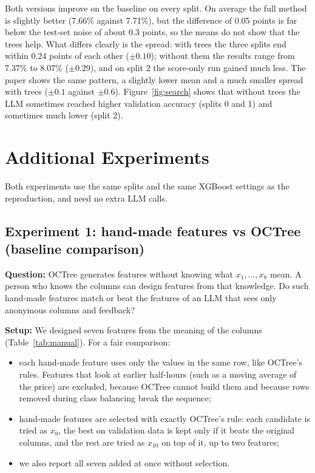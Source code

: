 \documentclass[11pt]{article}
\begin{document}
Both versions improve on the baseline on every split. On average the full method is slightly
better (7.66\% against 7.71\%), but the difference of 0.05 points is far below the test-set noise of
about 0.3 points, so the means do not show that the trees help. What differs clearly is the spread:
with trees the three splits end within 0.24 points of each other ($\pm0.10$); without them the
results range from 7.37\% to 8.07\% ($\pm0.29$), and on split 2 the score-only run gained much less.
The paper shows the same pattern, a slightly lower mean and a much smaller spread with trees ($\pm0.1$
against $\pm0.6$). Figure~\ref{fig:search} shows that without trees the LLM sometimes reached higher
validation accuracy (splits 0 and 1) and sometimes much lower (split 2).

\section{Additional Experiments}\label{sec:exp}

Both experiments use the same splits and the same XGBoost settings as the reproduction, and need no
extra LLM calls.

\subsection{Experiment 1: hand-made features vs OCTree (baseline comparison)}
\textbf{Question:} OCTree generates features without knowing what $x_1,\dots,x_8$ mean. A person who
knows the columns can design features from that knowledge. Do such hand-made features match or beat
the features of an LLM that sees only anonymous columns and feedback?

\textbf{Setup:} We designed seven features from the meaning of the columns
(Table~\ref{tab:manual}). For a fair comparison:
\begin{itemize}
  \item each hand-made feature uses only the values in the same row, like OCTree's rules. Features
        that look at earlier half-hours (such as a moving average of the price) are excluded,
        because OCTree cannot build them and because rows removed during class balancing break the
        sequence;
  \item hand-made features are selected with exactly OCTree's rule: each candidate is tried as
        $x_9$, the best on validation data is kept only if it beats the original columns, and the
        rest are tried as $x_{10}$ on top of it, up to two features;
  \item we also report all seven added at once without selection.
\end{itemize}
\end{document}
